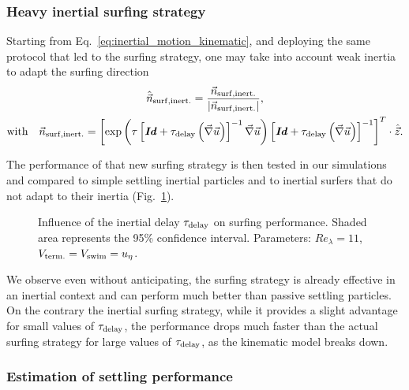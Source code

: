 \subsubsection{Heavy inertial surfing strategy}

Starting from Eq.~\eqref{eq:inertial_motion_kinematic}, and deploying the same protocol that led to the surfing strategy, one may take into account weak inertia to adapt the surfing direction
\begin{multline}
	\hat{\vec{n}}_{\mathrm{surf}, \mathrm{inert.}} = \frac{\vec{n}_{\mathrm{surf}, \mathrm{inert.}}}{\lvert\vec{n}_{\mathrm{surf}, \mathrm{inert.}}\rvert}, \\ 
	\text{with} \quad \vec{n}_{\mathrm{surf}, \mathrm{inert.}} = \left[ \exp \left( \tau \left[ \boldsymbol{\mathit{Id}} + \tau_{\mathrm{delay}} \left(\vec{\nabla} \vec{u}\right) \right]^{-1} \vec{\nabla} \vec{u} \right) \left[ \boldsymbol{\mathit{Id}} + \tau_{\mathrm{delay}} \left(\vec{\nabla} \vec{u}\right) \right]^{-1} \right]^T \cdot \hat{\vec{z}}.
\end{multline}

The performance of that new surfing strategy is then tested in our simulations and compared to simple settling inertial particles and to inertial surfers that do not adapt to their inertia (Fig.~\ref{fig:passive_inertial_surf}).
\begin{figure}%
	\centering
	
	\caption[Influence of the inertial delay $\InertialDelay$ on surfing performance.]{
		Influence of the inertial delay $\InertialDelay$ on surfing performance.
		Shaded area represents the 95\% confidence interval.
		Parameters: $\mathit{Re}_{\lambda} = 11$, $V_{\mathrm{term.}} = V_{\mathrm{swim}} = u_{\eta}$.
	}
	\label{fig:passive_inertial_surf}
\end{figure}
We observe even without anticipating, the surfing strategy is already effective in an inertial context and can perform much better than passive settling particles.
On the contrary the inertial surfing strategy, while it provides a slight advantage for small values of $\InertialDelay$, the performance drops much faster than the actual surfing strategy for large values of $\InertialDelay$, as the kinematic model breaks down.

\subsubsection{Estimation of settling performance}

